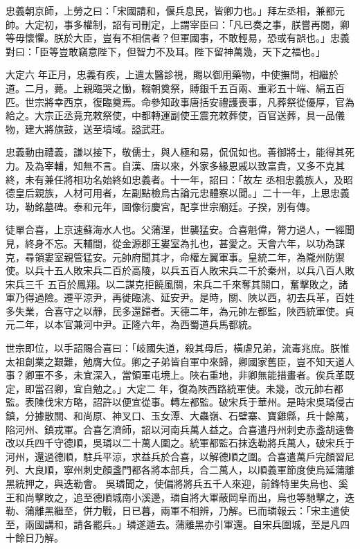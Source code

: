\begin{pinyinscope}
 忠義朝京師，上勞之曰：「宋國請和，偃兵息民，皆卿力也。」拜左丞相，兼都元帥。大定初，事多權制，詔有司刪定，上謂宰臣曰：「凡已奏之事，朕嘗再閱，卿等毋懷懼。朕於大臣，豈有不相信者？但軍國事，不敢輕易，恐或有誤也。」忠義對曰：「臣等豈敢竊意陛下，但智力不及耳。陛下留神萬幾，天下之福也。」



 大定六
 年正月，忠義有疾，上遣太醫診視，賜以御用藥物，中使撫問，相繼於道。二月，薨。上親臨哭之慟，輟朝奠祭，賻銀千五百兩、重彩五十端、絹五百匹。世宗將幸西京，復臨奠焉。命參知政事唐括安禮護喪事，凡葬祭從優厚，官為給之。大宗正丞竟充敕祭使，中都轉運副使王震充敕葬使，百官送葬，具一品儀物，建大將旗鼓，送至墳域。謚武莊。



 忠義動由禮義，謙以接下，敬儒士，與人極和易，侃侃如也。善御將士，能得其死力。及為宰輔，知無不言。自漢、唐以來，外家多緣恩戚以致富貴，又多不克其終，未有兼任將相功名始終如忠義者。十一年，詔曰：「故左
 丞相忠義族人，及昭德皇后親族，人材可用者，左副點檢烏古論元忠體察以聞。」二十一年，上思忠義功，勒銘墓碑。泰和元年，圖像衍慶宮，配享世宗廟廷。子揆，別有傳。



 徒單合喜，上京速蘇海水人也。父蒲涅，世襲猛安。合喜魁偉，膂力過人，一經聞見，終身不忘。天輔間，從金源郡王婁室為扎也，甚愛之。天會六年，以功為謀克，尋領婁室親管猛安。元帥府聞其才，命權左翼軍事。皇統二年，為隴州防禦使。以兵十五人敗宋兵二百於高陵，以兵五百人敗宋兵二千於秦州，以兵八百人敗宋兵三千
 五百於鳳翔。以二謀克拒饒風關，宋兵二千來奪其關口，奮擊敗之，諸軍乃得過險。遷平涼尹，再徙臨洮、延安尹。是時，關、陜以西，初去兵革，百姓多失業，合喜守之以靜，民多還歸者。天德二年，為元帥左都監，陜西統軍使。貞元二年，以本官兼河中尹。正隆六年，為西蜀道兵馬都統。



 世宗即位，以手詔賜合喜曰：「岐國失道，殺其母后，橫虐兄弟，流毒兆庶。朕惟太祖創業之艱難，勉膺大位。卿之子弟皆自軍中來歸，卿國家舊臣，豈不知天道人事？卿軍不多，未宜深入，當領軍屯境上。陜右重地，非卿無能措畫者。俟兵革既定，即當召卿，宜自勉之。」大定二
 年，復為陜西路統軍使。未幾，改元帥右都監。表陳伐宋方略，詔許以便宜從事。轉左都監。破宋兵于華州。是時宋吳璘侵古鎮，分據散關、和尚原、神叉口、玉女潭、大蟲嶺、石壁寨、寶雞縣，兵十餘萬，陷河州、鎮戎軍。合喜乞濟師，詔以河南兵萬人益之。合喜遣丹州刺史赤盞胡速魯改以兵四千守德順，吳璘以二十萬人圍之。統軍都監石抹迭勒將兵萬人，破宋兵于河州，還過德順，駐兵平涼，求益兵於合喜，以解德順之圍。合喜遣萬戶完顏習尼列、大良順，寧州刺史顏盞門都各將本部兵，合二萬人，以順義軍節度使烏延蒲離黑統押之，與迭勒會。
 吳璘聞之，使偏將將兵五千人來迎，前鋒特里失烏也、奚王和尚擊敗之，追至德順城南小溪邊，璘自將大軍蔽岡阜而出，烏也等馳擊之，迭勒、蒲離黑繼至，併力戰，日已暮，兩軍不相辨，乃解。已而璘報云：「宋主遣使至，兩國講和，請各罷兵。」璘遂遁去。蒲離黑亦引軍還。自宋兵圍城，至是凡四十餘日乃解。




\end{pinyinscope}
